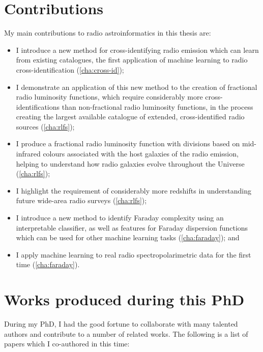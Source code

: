\section{Contributions}
\label{sec:contributions}

My main contributions to radio astroinformatics in this thesis are:
\begin{itemize}
    \item I introduce a new method for cross-identifying radio emission which can learn from existing catalogues, the first application of machine learning to radio cross-identification (\autoref{cha:cross-id});
    \item I demonstrate an application of this new method to the creation of fractional radio luminosity functions, which require considerably more cross-identifications than non-fractional radio luminosity functions, in the process creating the largest available catalogue of extended, cross-identified radio sources (\autoref{cha:rlfs});
    \item I produce a fractional radio luminosity function with divisions based on mid-infrared colours associated with the host galaxies of the radio emission, helping to understand how radio galaxies evolve throughout the Universe (\autoref{cha:rlfs});
    \item I highlight the requirement of considerably more redshifts in understanding future wide-area radio surveys (\autoref{cha:rlfs});
    \item I introduce a new method to identify Faraday complexity using an interpretable classifier, as well as features for Faraday dispersion functions which can be used for other machine learning tasks (\autoref{cha:faraday}); and
    \item I apply machine learning to real radio spectropolarimetric data for the first time (\autoref{cha:faraday}).
\end{itemize}

\newpage

\section{Works produced during this PhD}
\label{sec:works}

During my PhD, I had the good fortune to collaborate with many talented authors and contribute to a number of related works. The following is a list of papers which I co-authored in this time:

